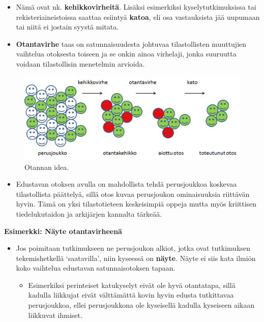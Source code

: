 \documentclass[
]{book}
\providecommand{\tightlist}{%
  \setlength{\itemsep}{0pt}\setlength{\parskip}{0pt}}
\begin{document}
\begin{itemize}
\begin{itemize}
    \begin{itemize}
    \tightlist
    \item
      Nämä ovat nk. \textbf{kehikkovirheitä}. Lisäksi esimerkiksi kyselytutkimuksissa tai rekisteriaineistoissa saattaa esiintyä \textbf{katoa}, eli osa vastauksista jää uupumaan tai niitä ei jostain syystä mitata.
    \item
      \textbf{Otantavirhe} taas on satunnaisuudesta johtuvaa tilastollisten muuttujien vaihtelua otoksesta toiseen ja se onkin ainoa virhelaji, jonka suuruutta voidaan tilastollisin menetelmin arvioida.
    \end{itemize}
  \end{itemize}
\end{itemize}

\begin{figure}

{\centering \includegraphics[width=1\linewidth]{images/otanta} 

}

\caption{Otannan idea.}\label{fig:otanta}
\end{figure}

\begin{itemize}
\tightlist
\item
  Edustavan otoksen avulla on mahdollista tehdä perusjoukkoa koskevaa tilastollista päättelyä, sillä otos kuvaa perusjoukon ominaisuuksia riittävän hyvin. Tämä on yksi tilastotieteen keskeisimpiä oppeja mutta myös kriittisen tiedelukutaidon ja arkijärjen kannalta tärkeää.
\end{itemize}

\begin{eblock}{}

\textbf{Esimerkki: Näyte otantavirheenä}

\begin{itemize}
\tightlist
\item
  Jos poimitaan tutkimukseen ne perusjoukon alkiot, jotka ovat tutkimuksen tekemishetkellä `saatavilla', niin kyseessä on \textbf{näyte}. Näyte ei siis kata ilmiön koko vaihtelua edustavan satunnaisotoksen tapaan.

  \begin{itemize}
  \tightlist
  \item
    Esimerkiksi perinteiset katukyselyt eivät ole hyvä otantatapa, sillä kadulla liikkujat eivät välttämättä kovin hyvin edusta tutkittavaa perusjoukkoa, ellei perusjoukkona ole kyseisellä kadulla kyseiseen aikaan liikkuvat ihmiset.
  \end{itemize}
\end{itemize}

\end{eblock}
\end{document}
